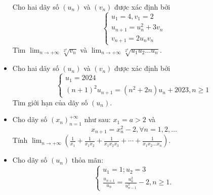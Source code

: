 \documentclass[11pt]{scrartcl}
\begin{document}
\begin{itemize}[label=, leftmargin=0em, itemsep=0.5em]
\begin{btvn}
        Cho hai dãy số $(u_n)$ và $(v_n)$ được xác định bởi
        \[
            \left\{
                \begin{array}{l}
                    u_1 = 4, v_1 = 2\\
                    u_{n + 1} = u_n^2 + 3v_n\\
                    v_{n + 1} =2u_nv_n
                \end{array}
            \right.
        \]
        Tìm $\displaystyle \lim_{n \to +\infty}\sqrt[2^n]{v_n}$ và $\displaystyle \lim_{n \to +\infty}\sqrt[2^n]{u_1u_2\dots u_n}$.
    \end{btvn}
    \item \begin{btvn}
        Cho hai dãy số $(u_n)$ và $(v_n)$ được xác định bởi
        \[
            \left\{
                \begin{array}{l}
                    u_1 = 2024\\
                    (n + 1)^2u_{n + 1} =(n^2 + 2n)u_n + 2023, n \geq 1
                \end{array}
            \right.
        \]
        Tìm giới hạn của dãy số $(u_n)$.
    \end{btvn}
    \item \begin{btvn}
        Cho dãy số $\left(x_n\right)_{n=1}^{+\infty}$ như sau: $x_1=a>2$ và
            $$
            x_{n+1}=x_n^2-2, \forall n=1,2, \ldots
            $$
            Tính $\displaystyle\lim _{n \rightarrow+\infty}\left(\frac{1}{x_1}+\frac{1}{x_1 x_2}+\frac{1}{x_1 x_2 x_3}+\cdots+\frac{1}{x_1 x_2 \ldots x_n}\right)$.
    \end{btvn}
    \item \begin{btvn}
        Cho dãy số $\left(u_n\right)$ thỏa mãn:
        $$
        \left\{\begin{array}{l}
        u_1=1 ; u_2=3 \\
        \frac{u_{n+1}}{u_n}=\frac{u_n^2}{u_{n-1}^2}-2, n \geq 1 .
        \end{array}\right.
        $$


\end{btvn}
\end{itemize}
\end{document}
